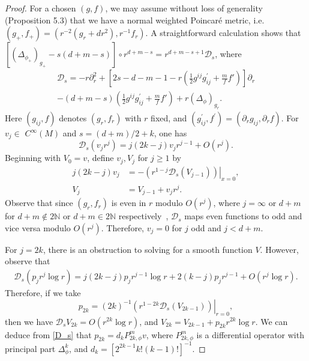 \documentclass{amsart}
\begin{document}
\begin{proof}
For a chosen $(g,f)$, we may assume without loss of generality~{\cites{CaseKhaitan2022} (Proposition 5.3)} that we have a normal weighted Poincar\'e metric, i.e. $(g_+,f_+)=(r^{-2}\left(g_{r}+d r^{2}\right),r^{-1}f_r)$. A straightforward calculation shows that $\left[(\Delta_{\phi_+})_{g_+}-s(d+m-s)\right] \circ r^{d+m-s}=r^{d+m-s+1} \mathcal{D}_{s}$, where
\begin{multline}
\label{D_s}
\mathcal{D}_{s}=-r \partial_{r}^{2}+\left[2 s-d-m-1-r\left(\frac{1}{2} g^{i j} g_{i j}^{\prime}+\frac{m}{f}f'\right)\right] \partial_{r}\\
-(d+m-s)\left(\frac{1}{2} g^{i j} g_{i j}^{\prime}+\frac{m}{f}f'\right)+r (\Delta_\phi)_{g_{r}}.
\end{multline}
Here $(g_{i j},f)$ denotes $(g_{r},f_r)$ with $r$ fixed, and $(g_{i j}^{\prime},f^{\prime})=(\partial_{r} g_{i j},\partial_r f)$. For $v_{j} \in$ $C^{\infty}(M)$ and $s=(d+m)/2+k$, one has
\begin{equation*}
\mathcal{D}_{s}\left(v_{j} r^{j}\right)=j(2k-j) v_{j} r^{j-1}+O\left(r^{j}\right).
\end{equation*}
Beginning with $V_{0}=v$, define $v_{j}, V_{j}$ for $j \geq 1$ by
\begin{equation*}
\label{4.6}
\begin{aligned}
j(2k-j) v_{j}&=-\left.\left(r^{1-j} \mathcal{D}_{s}\left(V_{j-1}\right)\right)\right|_{x=0}, \\
V_{j}&=V_{j-1}+v_{j} r^{j}.
\end{aligned}
\end{equation*} Observe that since $(g_{r},f_r)$ is even in $r$ modulo $O(r^j)$, where $j=\infty$ or $d+m$ for $d+m\notin 2\mathbb{N}$ or $d+m\in 2\mathbb{N}$ respectively~\cites{CaseKhaitan2022}, $\mathcal{D}_{s}$ maps even functions to odd and vice versa modulo $O(r^j)$. Therefore, $v_{j}=0$ for $j$ odd and $j<d+m$. 

For $j=2k$, there is an obstruction to solving for a smooth function $V$. However, observe that
\begin{align*}
\mathcal{D}_{s}\left(p_{j} r^{j} \log r\right)=j (2 k-j) p_{j} r^{j-1} \log r+2(k- j) p_{j} r^{j-1} 
+O\left(r^{j} \log r\right).
\end{align*}
Therefore, if we take
$$
p_{2 k}=\left.(2 k)^{-1}\left(r^{1-2 k} \mathcal{D}_{s}\left(V_{2 k-1}\right)\right)\right|_{r=0},
$$
then we have $\mathcal{D}_{s} V_{2 k}=O\left(r^{2 k} \log r\right)$, and $V_{2k}=V_{2k-1}+p_{2k}r^{2k}\log r$. We can deduce from \cref{D_s} that $p_{2k}=d_kP_{2k,\phi}^m v$, where $P_{2k,\phi}^m$ is a differential operator with principal part $\Delta_\phi^k$, and $d_k=[2^{2k-1}k!(k-1)!]^{-1}$.


\end{proof}
\end{document}
